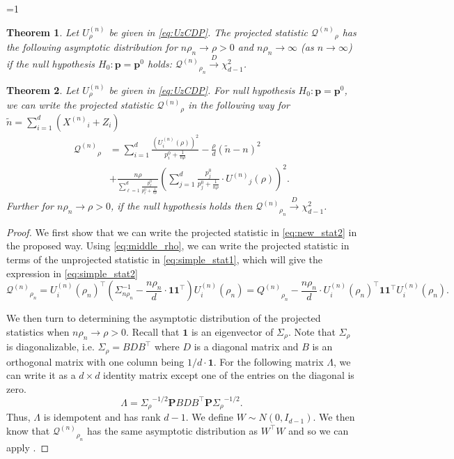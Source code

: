 \documentclass[twoside,letterpaper]{article} \usepackage{aistats2017}
\newtheorem{theorem}{Theorem}[section]
\theoremstyle{definition}
\theoremstyle{remark}
\begin{document}
=1
\begin{theorem}
Let ${U^{(n)}_{{\rho}}}$ be given in \eqref{eq:UzCDP}.  The projected statistic ${\pmb{\mathcal{Q}}^{({n})}}_{\rho}$ has the following asymptotic distribution for $ n\rho_n \to \rho>0$ and $n \rho_n \to \infty$ (as $n\rightarrow\infty$) if the null hypothesis $H_0: {\mathbf{p}} = {{\mathbf{p}}^0}$ holds: 
${\pmb{\mathcal{Q}}^{({n})}}_{\rho_n} \stackrel{D}{\to} \chi^2_{d-1}$.    
\label{thm:proj_asympt}
\end{theorem}
\else
\begin{theorem}
Let ${U^{(n)}_{{\rho}}}$ be given in \eqref{eq:UzCDP}. For null hypothesis $H_0: {\mathbf{p}} = {{\mathbf{p}}^0}$, we can write the projected statistic ${\pmb{\mathcal{Q}}^{({n})}}_{\rho}$ in the following way for $\tilde n = \sum_{i=1}^d ({X^{({n})}}_i + Z_i)$
\begin{align}
{\pmb{\mathcal{Q}}^{({n})}}_{\rho} & =   \sum\limits_{i=1}^d \frac{\left(U_i^{(n)}(\rho)\right)^2}{p_i^0+\frac{1}{n\rho}} - \frac{\rho}{d} \left( \tilde n - n\right)^2\nonumber \\ 
& + \frac{n\rho}{\sum_{\ell=1}^d  \frac{p_\ell^0}{p_\ell^0 + \frac{1}{n\rho}}}\left(\sum\limits_{j=1}^d  \frac{p_j^0}{p_j^0 + \frac{1}{n\rho}}\cdot {U^{({n})}}_j(\rho)\right)^2 .
\label{eq:simple_stat2}
\end{align}
Further for $n\rho_n \to \rho>0$, if the null hypothesis holds then ${\pmb{\mathcal{Q}}^{({n})}}_{\rho_n} \stackrel{D}{\to} \chi^2_{d-1}$.  
\label{thm:proj_asympt}
\end{theorem}
\begin{proof}
We first show that we can write the projected statistic in \eqref{eq:new_stat2} in the proposed way.  Using \eqref{eq:middle_rho}, we can write the projected statistic in terms of the unprojected statistic in \eqref{eq:simple_stat1}, which will give the expression in \eqref{eq:simple_stat2}
$$
{\pmb{\mathcal{Q}}^{({n})}}_{\rho_n} =  U_i^{(n)}(\rho_n)^\intercal \left( \Sigma_{n\rho_n}^{-1} - \frac{ n\rho_n }{d} \cdot {\pmb{1}}{\pmb{1}}^\intercal \right)U_i^{(n)}(\rho_n) = {Q^{({n})}}_{\rho_n} - \frac{n \rho_n }{d} \cdot U_i^{(n)}(\rho_n)^\intercal {\pmb{1}}{\pmb{1}}^\intercal U_i^{(n)}(\rho_n).
$$

We then turn to determining the asymptotic distribution of the projected statistics when $n \rho_n \to \rho >0$.  Recall that ${\pmb{1}}$ is an eigenvector of ${{\Sigma}_{{\rho}}}$.  Note that ${{\Sigma}_{{\rho}}}$ is diagonalizable, i.e. ${{\Sigma}_{{\rho}}} = BDB^\intercal$ where $D$ is a diagonal matrix and $B$ is an orthogonal matrix with one column being $1/d \cdot {\pmb{1}}$.  For the following matrix $\Lambda$, we can write it as a $d\times d$ identity matrix except one of the entries on the diagonal is zero.
$$
\Lambda = {{\Sigma}_{{\rho}}}^{-1/2} {\pmb{P}} BDB^\intercal{\pmb{P}} {{\Sigma}_{{\rho}}}^{-1/2}.
$$
Thus, $\Lambda$ is idempotent and has rank $d-1$.  We define $W \sim N(0,I_{d-1})$.   We then know that ${\pmb{\mathcal{Q}}^{({n})}}_{\rho_n}$ has the same asymptotic distribution as $W^\intercal W$ and so we can apply .    
\end{proof}
\end{document}
